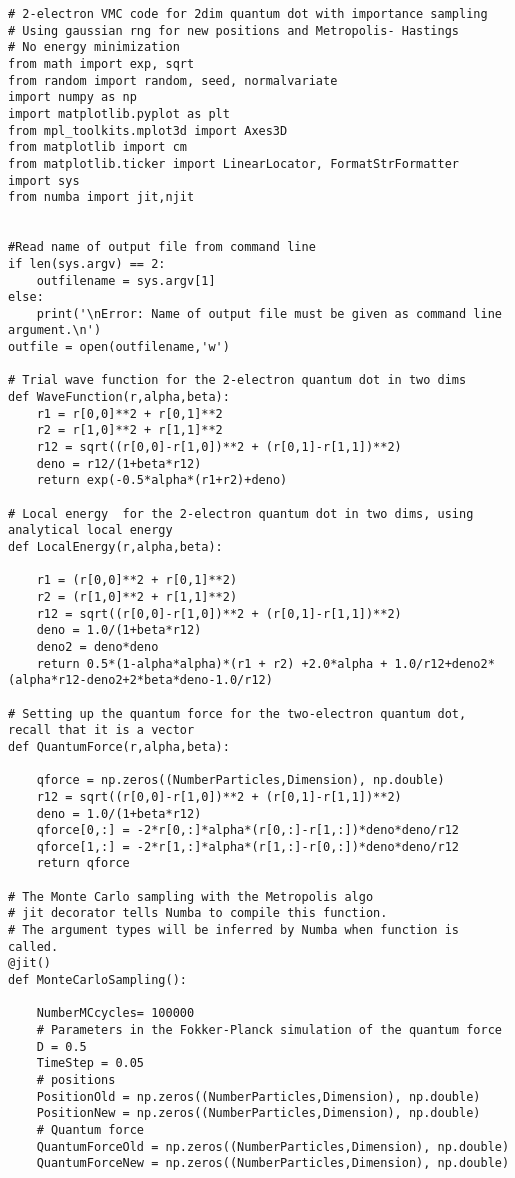 \documentclass[%
oneside,                 %
final,                   %
10pt]{article}
\begin{document}
\begin{verbatim}
# 2-electron VMC code for 2dim quantum dot with importance sampling
# Using gaussian rng for new positions and Metropolis- Hastings 
# No energy minimization
from math import exp, sqrt
from random import random, seed, normalvariate
import numpy as np
import matplotlib.pyplot as plt
from mpl_toolkits.mplot3d import Axes3D
from matplotlib import cm
from matplotlib.ticker import LinearLocator, FormatStrFormatter
import sys
from numba import jit,njit


#Read name of output file from command line
if len(sys.argv) == 2:
    outfilename = sys.argv[1]
else:
    print('\nError: Name of output file must be given as command line argument.\n')
outfile = open(outfilename,'w')

# Trial wave function for the 2-electron quantum dot in two dims
def WaveFunction(r,alpha,beta):
    r1 = r[0,0]**2 + r[0,1]**2
    r2 = r[1,0]**2 + r[1,1]**2
    r12 = sqrt((r[0,0]-r[1,0])**2 + (r[0,1]-r[1,1])**2)
    deno = r12/(1+beta*r12)
    return exp(-0.5*alpha*(r1+r2)+deno)

# Local energy  for the 2-electron quantum dot in two dims, using analytical local energy
def LocalEnergy(r,alpha,beta):
    
    r1 = (r[0,0]**2 + r[0,1]**2)
    r2 = (r[1,0]**2 + r[1,1]**2)
    r12 = sqrt((r[0,0]-r[1,0])**2 + (r[0,1]-r[1,1])**2)
    deno = 1.0/(1+beta*r12)
    deno2 = deno*deno
    return 0.5*(1-alpha*alpha)*(r1 + r2) +2.0*alpha + 1.0/r12+deno2*(alpha*r12-deno2+2*beta*deno-1.0/r12)

# Setting up the quantum force for the two-electron quantum dot, recall that it is a vector
def QuantumForce(r,alpha,beta):

    qforce = np.zeros((NumberParticles,Dimension), np.double)
    r12 = sqrt((r[0,0]-r[1,0])**2 + (r[0,1]-r[1,1])**2)
    deno = 1.0/(1+beta*r12)
    qforce[0,:] = -2*r[0,:]*alpha*(r[0,:]-r[1,:])*deno*deno/r12
    qforce[1,:] = -2*r[1,:]*alpha*(r[1,:]-r[0,:])*deno*deno/r12
    return qforce
    
# The Monte Carlo sampling with the Metropolis algo
# jit decorator tells Numba to compile this function.
# The argument types will be inferred by Numba when function is called.
@jit()
def MonteCarloSampling():

    NumberMCcycles= 100000
    # Parameters in the Fokker-Planck simulation of the quantum force
    D = 0.5
    TimeStep = 0.05
    # positions
    PositionOld = np.zeros((NumberParticles,Dimension), np.double)
    PositionNew = np.zeros((NumberParticles,Dimension), np.double)
    # Quantum force
    QuantumForceOld = np.zeros((NumberParticles,Dimension), np.double)
    QuantumForceNew = np.zeros((NumberParticles,Dimension), np.double)


\end{verbatim}
\end{document}

